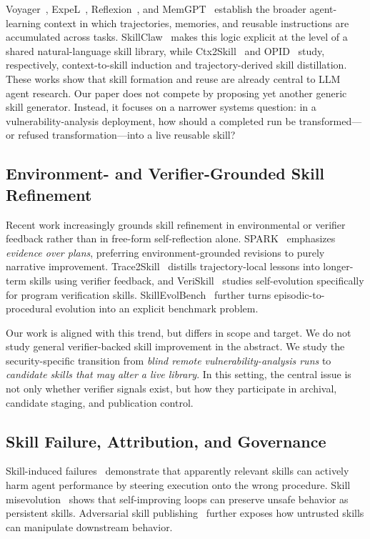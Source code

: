 ﻿\documentclass[preprint,12pt]{elsarticle}
\begin{document}
Voyager~\cite{voyager}, ExpeL~\cite{expel}, Reflexion~\cite{reflexion},
and MemGPT~\cite{memgpt} establish the broader agent-learning context in
which trajectories, memories, and reusable instructions are accumulated
across tasks.  SkillClaw~\cite{skillclaw} makes this logic explicit at the
level of a shared natural-language skill library, while
Ctx2Skill~\cite{ctx2skill} and OPID~\cite{opid} study, respectively,
context-to-skill induction and trajectory-derived skill distillation.
These works show that skill formation and reuse are already central to LLM
agent research.  Our paper does not compete by proposing yet another
generic skill generator.  Instead, it focuses on a narrower systems
question: in a vulnerability-analysis deployment, how should a completed
run be transformed---or refused transformation---into a live reusable
skill?

\subsection{Environment- and Verifier-Grounded Skill Refinement}

Recent work increasingly grounds skill refinement in environmental or
verifier feedback rather than in free-form self-reflection alone.
SPARK~\cite{spark} emphasizes \emph{evidence over plans}, preferring
environment-grounded revisions to purely narrative improvement.
Trace2Skill~\cite{trace2skill} distills trajectory-local lessons into
longer-term skills using verifier feedback, and
VeriSkill~\cite{veriskill} studies self-evolution specifically for program
verification skills.  SkillEvolBench~\cite{skillevolbench} further turns
episodic-to-procedural evolution into an explicit benchmark problem.

Our work is aligned with this trend, but differs in scope and target.  We
do not study general verifier-backed skill improvement in the abstract.
We study the security-specific transition from \emph{blind remote
vulnerability-analysis runs} to \emph{candidate skills that may alter a
live library}.  In this setting, the central issue is not only whether
verifier signals exist, but how they participate in archival, candidate
staging, and publication control.

\subsection{Skill Failure, Attribution, and Governance}

Skill-induced failures~\cite{skillharmful} demonstrate that apparently
relevant skills can actively harm agent performance by steering execution
onto the wrong procedure.  Skill misevolution~\cite{misevolution} shows
that self-improving loops can preserve unsafe behavior as persistent
skills.  Adversarial skill publishing~\cite{detourhijack} further exposes
how untrusted skills can manipulate downstream behavior.
\end{document}
